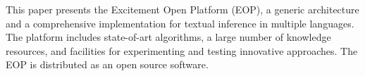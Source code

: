 This paper presents the Excitement Open Platform (EOP), a generic architecture and a comprehensive implementation for textual inference in multiple languages. The platform includes state-of-art algorithms, a large number of knowledge resources, and facilities for experimenting and testing innovative approaches.              The EOP is distributed as an open source software.
